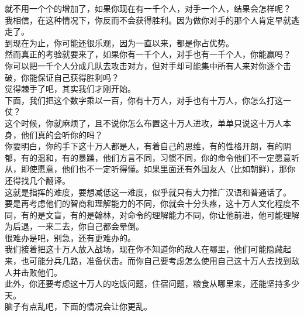 \begin{multicols}{\theparacolNo}
就不用一个个的增加了，如果你现在有一千个人，对手一个人，结果会怎样呢？\\

我相信，在这种情况下，你反而不会获得胜利。因为做你对手的那个人肯定早就逃走了。\\

到现在为止，你可能还很乐观，因为一直以来，都是你占优势。\\

然而真正的考验就要来了，如果你有一千个人，对手也有一千个人，你能赢吗？\\

你可以把一千个人分成几队去攻击对方，但对手却可能集中所有人来对你逐个击破，你能保证自己获得胜利吗？\\

觉得棘手了吧，其实我们才刚开始。\\

下面，我们把这个数字乘以一百，你有十万人，对手也有十万人，你怎么打这一仗？\\

这个时候，你就麻烦了，且不说你怎么布置这十万人进攻，单单只说这十万人本身，他们真的会听你的吗？\\

你要明白，你的手下这十万人都是人，有着自己的思维，有的性格开朗，有的阴郁，有的温和，有的暴躁，他们方言不同，习惯不同，你的命令他们不一定愿意听从，即使愿意，他们也不一定听得懂。如果里面还有外国友人（比如朝鲜），那你还得找几个翻译。\\

这就是指挥的难度，要想减低这一难度，似乎就只有大力推广汉语和普通话了。\\

要是再考虑他们的智商和理解能力的不同，你就会十分头疼，这十万人文化程度不同，有的是文盲，有的是翰林，对命令的理解能力不同，你让他前进，他可能理解为后退，一来二去，你自己都会晕倒。\\

很难办是吧，别急，还有更难办的。\\

我们接着把这十万人放入战场，现在你不知道你的敌人在哪里，他们可能隐藏起来，也可能分兵几路，准备伏击。而你自己要考虑怎么使用自己这十万人去找到敌人并击败他们。\\

此外，你还要考虑这十万人的吃饭问题，住宿问题，粮食从哪里来，还能坚持多少天。\\

脑子有点乱吧，下面的情况会让你更乱。\\


\end{multicols}
